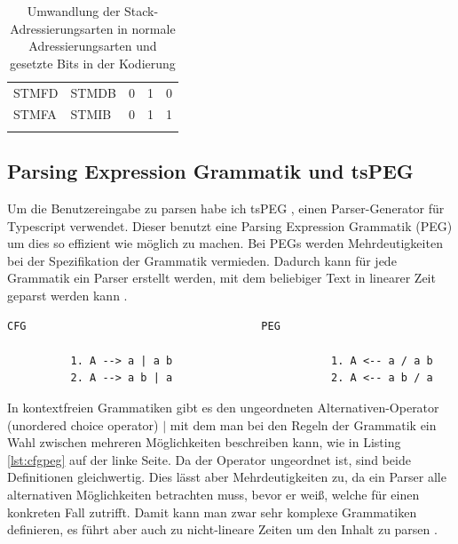 \documentclass[a4paper, 11pt, onecolumn]{article}
\begin{document}
\begin{table}[!htb]
\begin{tabular}{llccc}
STMFD                           & STMDB                              & 0                                    & 1                                    & 0                                    \\ \arrayrulecolor[gray]{.7}\hline
STMFA                           & STMIB                              & 0                                    & 1                                    & 1                                    \\ \arrayrulecolor{black}\hline
\end{tabular}
\caption{Umwandlung der Stack-Adressierungsarten in normale Adressierungsarten und gesetzte Bits in der Kodierung \cite{arm:2005}}
\end{table}

\subsection{Parsing Expression Grammatik und tsPEG}\label{sec:peg}

Um die Benutzereingabe zu parsen habe ich tsPEG \cite{tspeg}, einen Parser-Generator für Typescript \cite{typescript} verwendet. Dieser benutzt eine Parsing Expression Grammatik (PEG) \cite{peg} um dies so effizient wie möglich zu machen. Bei PEGs werden Mehrdeutigkeiten bei der Spezifikation der Grammatik vermieden. Dadurch kann für jede Grammatik ein Parser erstellt werden, mit dem beliebiger Text in linearer Zeit geparst werden kann \cite{peg}.\\

\begin{lstlisting}[basicstyle=\ttfamily\footnotesize, backgroundcolor=\color{backcolour}, caption={Definition einer Grammatik bei kontextfreien Grammatiken (links) und Parsing Expression Grammatiken (rechts) \cite{peg}},captionpos=b, label={lst:cfgpeg}]
                 CFG                                     PEG
             
          1. A --> a | a b                         1. A <-- a / a b
          2. A --> a b | a                         2. A <-- a b / a
\end{lstlisting}

In kontextfreien Grammatiken gibt es den ungeordneten Alternativen-Operator (unordered choice operator) $\mid$ mit dem man bei den Regeln der Grammatik ein Wahl zwischen mehreren Möglichkeiten beschreiben kann, wie in Listing \ref{lst:cfgpeg} auf der linke Seite. Da der Operator ungeordnet ist, sind beide Definitionen gleichwertig. Dies lässt aber Mehrdeutigkeiten zu, da ein Parser alle alternativen Möglichkeiten betrachten muss, bevor er weiß, welche für einen konkreten Fall zutrifft. Damit kann man zwar sehr komplexe Grammatiken definieren, es führt aber auch zu nicht-lineare Zeiten um den Inhalt zu parsen \cite{cfg}.
\end{document}
